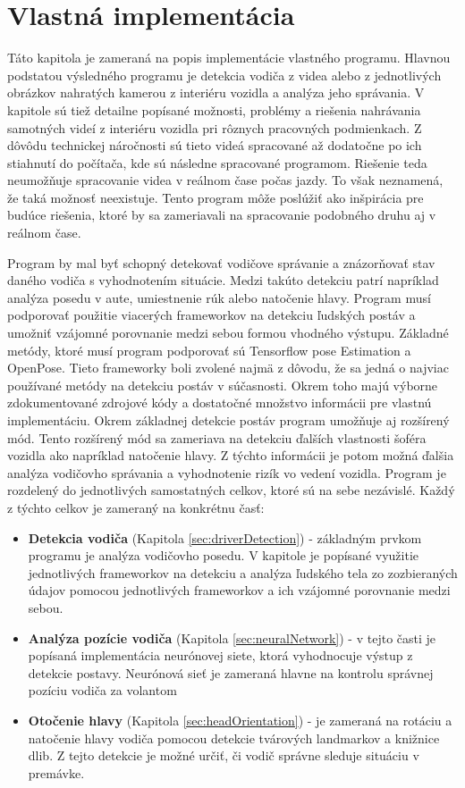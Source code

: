\documentclass[slovak,master,dept460,male,cpp,cpdeclaration]{diploma}
\begin{document}
\section{Vlastná implementácia}
\label{sec:Vlastná implementácia}
Táto kapitola je zameraná na  popis implementácie vlastného programu. Hlavnou podstatou výsledného programu je detekcia vodiča z videa alebo z jednotlivých obrázkov nahratých kamerou z interiéru vozidla a analýza jeho správania. V kapitole sú tiež detailne popísané možnosti, problémy a riešenia nahrávania samotných videí z interiéru vozidla pri rôznych pracovných podmienkach. Z dôvôdu technickej náročnosti sú tieto videá spracované až dodatočne po ich stiahnutí do počítača, kde sú následne spracované  programom. Riešenie teda neumožňuje spracovanie videa v reálnom čase počas jazdy. To však neznamená, že taká možnosť neexistuje. Tento program môže poslúžiť ako inšpirácia pre budúce riešenia, ktoré by sa zameriavali na spracovanie podobného druhu aj v reálnom čase.\par
Program  by mal byť schopný detekovať vodičove správanie a znázorňovať stav daného vodiča s vyhodnotením situácie. Medzi takúto detekciu patrí napríklad analýza posedu v aute, umiestnenie rúk alebo natočenie hlavy. Program musí podporovať použitie viacerých frameworkov na detekciu ľudských postáv a umožniť vzájomné porovnanie medzi sebou formou vhodného výstupu. Základné metódy, ktoré musí program podporovať sú Tensorflow pose Estimation a OpenPose. Tieto frameworky boli zvolené najmä z dôvodu, že sa jedná o najviac používané metódy na detekciu postáv v súčasnosti. Okrem toho majú výborne zdokumentované zdrojové kódy a dostatočné množstvo informácii pre vlastnú implementáciu. Okrem základnej detekcie postáv program umožňuje aj rozšírený mód. Tento rozšírený mód sa zameriava na detekciu ďalších vlastnosti šoféra vozidla ako napríklad natočenie hlavy. Z týchto informácii je potom možná ďalšia analýza vodičovho správania a vyhodnotenie rizík vo vedení vozidla. Program je rozdelený do jednotlivých samostatných celkov, ktoré sú na sebe nezávislé. Každý z týchto celkov je zameraný na konkrétnu časť:
\begin{itemize}
\item \textbf{Detekcia vodiča} (Kapitola \ref{sec:driverDetection}) - základným prvkom programu je  analýza vodičovho posedu.  V kapitole je popísané využitie jednotlivých frameworkov na detekciu a analýza ľudského tela zo zozbieraných údajov pomocou jednotlivých frameworkov a ich vzájomné porovnanie medzi sebou.

\item \textbf{Analýza pozície vodiča} (Kapitola \ref{sec:neuralNetwork}) - v tejto  časti je popísaná implementácia neurónovej siete, ktorá vyhodnocuje výstup z detekcie postavy. Neurónová sieť je zameraná hlavne  na kontrolu správnej pozíciu vodiča za volantom

\item \textbf{Otočenie hlavy} (Kapitola \ref{sec:headOrientation}) - je zameraná na rotáciu a natočenie hlavy vodiča pomocou detekcie tvárových landmarkov a knižnice dlib\cite{dlib09}. Z tejto detekcie je možné určiť, či vodič správne sleduje situáciu v premávke.
\end{itemize}
\end{document}
